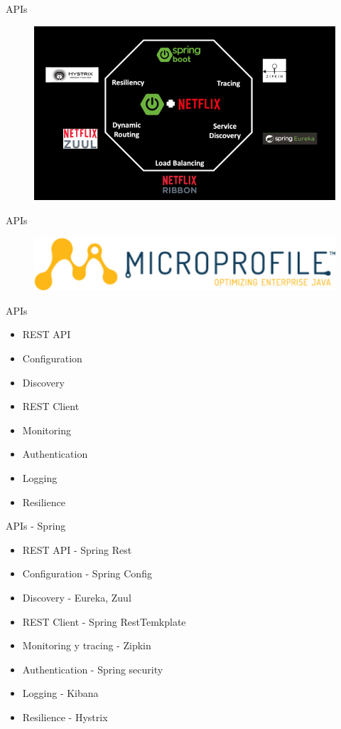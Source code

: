 \documentclass[aspectratio=169]{beamer}
\begin{document}
\begin{frame}{APIs}
    \begin{figure}
        \centering
        \includegraphics[width=0.7\linewidth]{Images/netflix.png}
        \label{fig:containe6r}
    \end{figure}
\end{frame}

\begin{frame}{APIs}
    \begin{figure}
        \centering
        \includegraphics[width=0.7\linewidth]{Images/microprofile.png}
        \label{fig:containe7r}
    \end{figure}
\end{frame}


\begin{frame}{APIs}
    \begin{itemize}
        \item REST API
        \item Configuration
        \item Discovery
        \item REST Client
        \item Monitoring
        \item Authentication
        \item Logging
        \item Resilience
    \end{itemize}
\end{frame}

\begin{frame}{APIs - Spring}
    \begin{itemize}
        \item REST API - Spring Rest
        \item Configuration - Spring Config
        \item Discovery - Eureka, Zuul
        \item REST Client - Spring RestTemkplate
        \item Monitoring y tracing - Zipkin
        \item Authentication - Spring security
        \item Logging - Kibana
        \item Resilience - Hystrix
    \end{itemize}
\end{frame}
\end{document}
